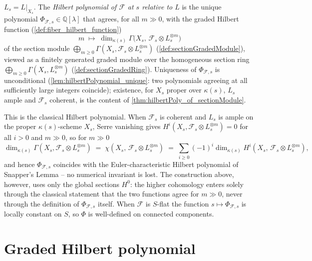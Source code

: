 \begin{definition}
  \(L_s = L|_{X_s}\). The \emph{Hilbert polynomial of \(\mathcal{F}\) at \(s\)
  relative to \(L\)} is the unique polynomial
  \(\Phi_{\mathcal{F},s} \in \mathbb{Q}[\lambda]\) that agrees, for all
  \(m \gg 0\), with the graded Hilbert function
  (\cref{def:fiber_hilbert_function})
  \[
    m \;\longmapsto\; \dim_{\kappa(s)} \Gamma\bigl(X_s,\, \mathcal{F}_s \otimes L_s^{\otimes m}\bigr)
  \]
  of the section module
  \(\bigoplus_{m \ge 0} \Gamma(X_s, \mathcal{F}_s \otimes L_s^{\otimes m})\)
  (\cref{def:sectionGradedModule}), viewed as a finitely generated graded module
  over the homogeneous section ring
  \(\bigoplus_{m \ge 0} \Gamma(X_s, L_s^{\otimes m})\)
  (\cref{def:sectionGradedRing}). Uniqueness of \(\Phi_{\mathcal{F},s}\) is
  unconditional (\cref{lem:hilbertPolynomial_unique}: two polynomials agreeing
  at all sufficiently large integers coincide); existence, for \(X_s\) proper
  over \(\kappa(s)\), \(L_s\) ample and \(\mathcal{F}_s\) coherent, is the
  content of \cref{thm:hilbertPoly_of_sectionModule}.

  This is the classical Hilbert polynomial. When \(\mathcal{F}_s\) is coherent
  and \(L_s\) is ample on the proper \(\kappa(s)\)-scheme \(X_s\), Serre vanishing
  gives \(H^i(X_s, \mathcal{F}_s \otimes L_s^{\otimes m}) = 0\) for all \(i > 0\)
  and \(m \gg 0\), so for \(m \gg 0\)
  \[
    \dim_{\kappa(s)} \Gamma(X_s, \mathcal{F}_s \otimes L_s^{\otimes m})
    \;=\; \chi(X_s,\, \mathcal{F}_s \otimes L_s^{\otimes m})
    \;=\; \sum_{i \ge 0} (-1)^i \dim_{\kappa(s)} H^i(X_s,\, \mathcal{F}_s \otimes L_s^{\otimes m}),
  \]
  and hence \(\Phi_{\mathcal{F},s}\) coincides with the Euler-characteristic
  Hilbert polynomial of Snapper's Lemma -- no numerical invariant is lost. The
  construction above, however, uses only the global sections \(H^0\): the higher
  cohomology enters solely through the classical statement that the two functions
  agree for \(m \gg 0\), never through the definition of \(\Phi_{\mathcal{F},s}\)
  itself. When \(\mathcal{F}\) is \(S\)-flat the function
  \(s \mapsto \Phi_{\mathcal{F},s}\) is locally constant on \(S\), so \(\Phi\) is
  well-defined on connected components.
\end{definition}

\section{Graded Hilbert polynomial}
\label{sec:graded_hilbert_polynomial}

